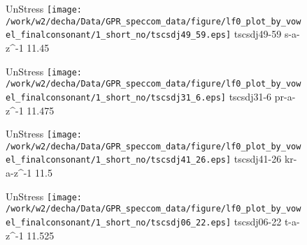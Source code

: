 \documentclass{article}
\begin{document}
\begin{figure}[t]
\begin{minipage}[b]{.24\textwidth}
UnStress
\centering
\texttt{[image: /work/w2/decha/Data/GPR\_speccom\_data/figure/lf0\_plot\_by\_vowel\_finalconsonant/1\_short\_no/tscsdj49\_59.eps]}
tscsdj49-59 s-a-z\textasciicircum-1 11.45
\end{minipage}
\begin{minipage}[b]{.24\textwidth}
UnStress
\centering
\texttt{[image: /work/w2/decha/Data/GPR\_speccom\_data/figure/lf0\_plot\_by\_vowel\_finalconsonant/1\_short\_no/tscsdj31\_6.eps]}
tscsdj31-6 pr-a-z\textasciicircum-1 11.475
\end{minipage}
\begin{minipage}[b]{.24\textwidth}
UnStress
\centering
\texttt{[image: /work/w2/decha/Data/GPR\_speccom\_data/figure/lf0\_plot\_by\_vowel\_finalconsonant/1\_short\_no/tscsdj41\_26.eps]}
tscsdj41-26 kr-a-z\textasciicircum-1 11.5
\end{minipage}
\begin{minipage}[b]{.24\textwidth}
UnStress
\centering
\texttt{[image: /work/w2/decha/Data/GPR\_speccom\_data/figure/lf0\_plot\_by\_vowel\_finalconsonant/1\_short\_no/tscsdj06\_22.eps]}
tscsdj06-22 t-a-z\textasciicircum-1 11.525
\end{minipage}
\end{figure}
\end{document}
